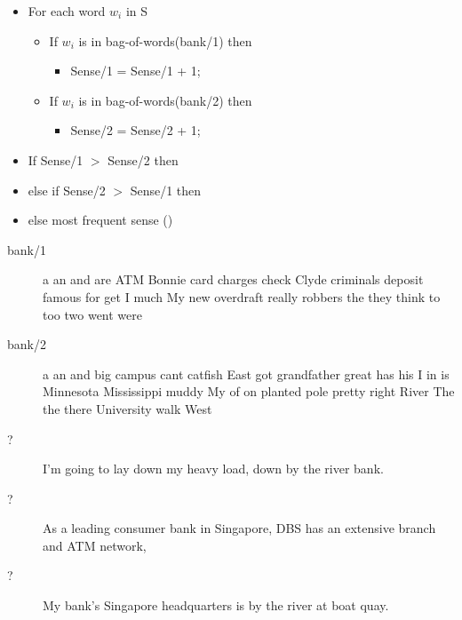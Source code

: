 \documentclass[a4paper,landscape,headrule,footrule,xetex]{foils}
\begin{document}

\begin{itemize}
\item For each word $w_i$ in S
  \begin{itemize}
  \item If $w_i$ is in bag-of-words(bank/1) then 
    \begin{itemize}
    \item       Sense/1 = Sense/1 + 1;
    \end{itemize}
  \item     If $w_i$ is in bag-of-words(bank/2) then
    \begin{itemize}
    \item 			Sense/2 = Sense/2 + 1;
    \end{itemize}
  \end{itemize}
\item If Sense/1 $>$ Sense/2 then  
\item else if Sense/2 $>$ Sense/1 then 
\item  else  most frequent sense ()
\end{itemize}


\begin{description}
\item[bank/1] a an and are ATM Bonnie card charges check Clyde criminals deposit famous for get I much My new overdraft really robbers the they think to too two went were
\item[bank/2]  
a an and big campus cant catfish East got grandfather great has his I in is Minnesota Mississippi muddy My of on planted pole pretty right River The the there University walk West
\end{description}

\begin{description}
\item[?] I'm going to lay down my heavy load, down by the river bank.
\item[?] As a leading consumer bank in Singapore, DBS has an extensive branch and ATM network,
\item[?] My bank's Singapore headquarters is by the river at boat quay.
\end{description}
\end{document}
